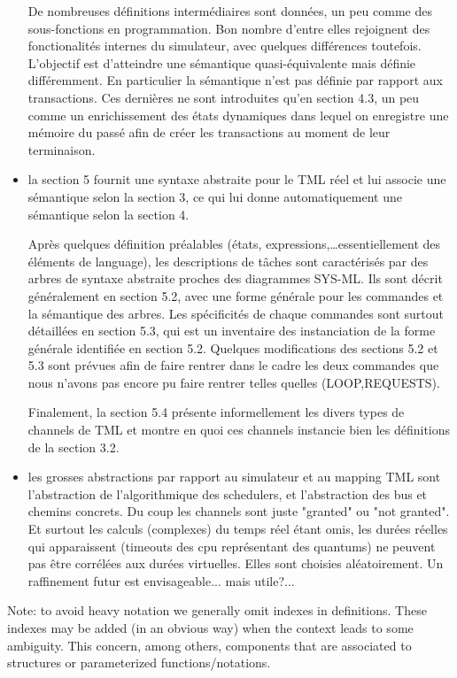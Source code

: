 \documentclass{article}
\begin{document}
\begin{itemize}
De nombreuses définitions intermédiaires sont données, un peu comme des sous-fonctions en pro\-gram\-mation. Bon nombre d'entre elles rejoignent des fonctionalités internes du simulateur, avec quelques différences toutefois. L'objectif est d'atteindre une sémantique quasi-équivalente mais définie différemment. En particulier la sémantique n'est pas définie par rapport aux transactions. Ces dernières ne sont introduites qu'en section 4.3, un peu comme un enrichissement des états dynamiques dans lequel on enregistre une mémoire du passé afin de créer les transactions au moment de leur terminaison.
\item la section 5 fournit une syntaxe abstraite pour le TML réel et lui associe une sémantique selon la  section 3, ce qui lui donne automatiquement une sémantique selon la section 4.

Après quelques définition préalables (états, expressions,\ldots essentiellement des éléments de language), les descriptions de tâches sont caractérisés par des arbres de syntaxe abstraite proches des diagram\-mes SYS-ML. Ils sont décrit généralement en section 5.2, avec une forme générale pour les comman\-des et la sémantique des arbres. Les spécificités de chaque comman\-des sont surtout détaillées en section 5.3, qui est un inventaire des instanciation de la forme générale identifiée en section 5.2. Quelques modifications des sections 5.2 et 5.3 sont prévues afin de faire rentrer dans le cadre les deux commandes que nous n'avons pas encore pu faire rentrer telles quelles (LOOP,REQUESTS).

Finalement, la section 5.4 présente informellement les divers types de channels de TML et montre en quoi ces channels instancie bien les définitions de la section 3.2.
\item les grosses abstractions par rapport au simulateur et au mapping TML sont l'abstraction de l'algorithmique des schedulers, et l'abstraction des bus et chemins concrets. Du coup les channels sont juste "granted" ou "not granted". Et surtout les calculs (complexes) du temps réel étant omis, les durées réelles qui apparaissent (timeouts des cpu représentant des quantums) ne peuvent pas être corrélées aux durées virtuelles. Elles sont choisies aléatoirement. Un raffinement futur est envisageable... mais utile?...
\end{itemize}
\tableofcontents
Note: to avoid heavy notation we generally omit indexes in definitions. These indexes may be added (in an obvious way) when the context leads to some ambiguity. This concern, among others, components that are associated to structures or parameterized functions/notations.
\end{document}
